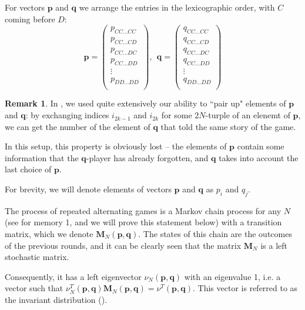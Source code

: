 \documentclass{article}
\def\p{\mathbf{p}}
\def\Mb{\mathbf{M}}
\def\q{\mathbf{q}}
\theoremstyle{definition}
\newtheorem{remark}[theorem]{Remark}
\numberwithin{equation}{section}
\begin{document}
For vectors $\p$ and $\q$ we  arrange the entries in the lexicographic order, with $C$ coming before $D$:
 \[
\p = \begin{pmatrix}
    p_{CC\ldots CC}\\
    p_{CC\ldots CD}\\
    p_{CC\ldots DC}\\
    p_{CC\ldots DD}\\
    \vdots\\
    p_{DD\ldots DD}\\
\end{pmatrix}, \ \ \q = \begin{pmatrix}
    q_{CC\ldots CC}\\
    q_{CC\ldots CD}\\
    q_{CC\ldots DC}\\
    q_{CC\ldots DD}\\
    \vdots\\
    q_{DD\ldots DD}\\
\end{pmatrix}
\]
\begin{remark}
    In \cite{balabanova2024adaptive}, we used quite extensively our ability to ``pair up" elements of $\p$ and $\q$: by exchanging indices $i_{2k-1}$ and $i_{2k}$ for some $2N$-turple of an elenemt of $\p$, we can  get the number of the element of $\q$ that told the same story of the game. 

    In this setup, this property is obviously lost -- the elements of $\p$ contain some information that the $\q$-player has already forgotten, and $\q$ takes into account the last choice of $\p$. 
\end{remark}

For brevity, we will denote elements of vectors $\p$ and $\q$ as $p_{i}$ and $q_{j}$.


The process of repeated alternating games is a Markov chain process for any $N$ (see \cite{nowak1994alternating} for memory 1, and we will prove this statement below) with a transition matrix, which we denote $\Mb_N(\p,\q)$. The states of this chain are the outcomes of the previous rounds, and it can be clearly seen that the matrix $\Mb_N$ is a left stochastic matrix. 

Consequently, it has a left eigenvector $\nu_N(\p,\q)$ with an eigenvalue 1, i.e. a vector such that $\nu_N^T(\p,\q)\Mb_N(\p,\q) = \nu^T(\p,\q)$. This vector is referred to as the invariant distribution (\cite{norris1998markov}). 
\end{document}
